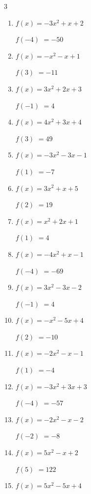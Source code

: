 \begin{multicols}{3}
\begin{enumerate}
$f(-5)$
        $= 35$

\columnbreak %

\resetques

  \item $f(x)=-3x^{2}+x+2$

$f(-4)$
        $= -50$

  \item $f(x)=-x^{2}-x+1$

$f(3)$
        $= -11$

  \item $f(x)=3x^{2}+2x+3$

$f(-1)$
        $= 4$

  \item $f(x)=4x^{2}+3x+4$

$f(3)$
        $= 49$

  \item $f(x)=-3x^{2}-3x-1$

$f(1)$
        $= -7$

  \item $f(x)=3x^{2}+x+5$

$f(2)$
        $= 19$

  \item $f(x)=x^{2}+2x+1$

$f(1)$
        $= 4$

  \item $f(x)=-4x^{2}+x-1$

$f(-4)$
        $= -69$

  \item $f(x)=3x^{2}-3x-2$

$f(-1)$
        $= 4$

  \item $f(x)=-x^{2}-5x+4$

$f(2)$
        $= -10$

  \item $f(x)=-2x^{2}-x-1$

$f(1)$
        $= -4$

  \item $f(x)=-3x^{2}+3x+3$

$f(-4)$
        $= -57$

  \item $f(x)=-2x^{2}-x-2$

$f(-2)$
        $= -8$

  \item $f(x)=5x^{2}-x+2$

$f(5)$
        $= 122$

  \item $f(x)=5x^{2}-5x+4$


\end{enumerate}
\end{multicols}
